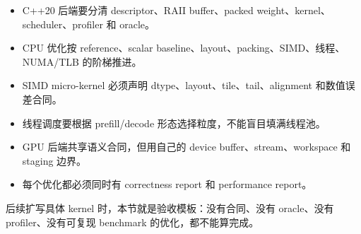 \begin{itemize}
  \item C++20 后端要分清 descriptor、RAII buffer、packed weight、kernel、scheduler、profiler 和 oracle。
  \item CPU 优化按 reference、scalar baseline、layout、packing、SIMD、线程、NUMA/TLB 的阶梯推进。
  \item SIMD micro-kernel 必须声明 dtype、layout、tile、tail、alignment 和数值误差合同。
  \item 线程调度要根据 prefill/decode 形态选择粒度，不能盲目填满线程池。
  \item GPU 后端共享语义合同，但用自己的 device buffer、stream、workspace 和 staging 边界。
  \item 每个优化都必须同时有 correctness report 和 performance report。
\end{itemize}

后续扩写具体 kernel 时，本节就是验收模板：没有合同、没有 oracle、没有 profiler、没有可复现 benchmark 的优化，都不能算完成。
